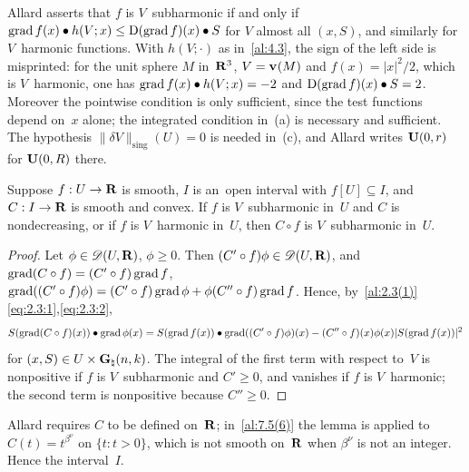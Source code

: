 \begin{remark}
    \label{rem:7.5(2)}
    Allard asserts that $f$ is $V$~subharmonic if and only if $\operatorname{grad} f(x) \bullet h(V;x) \le
    \mathrm{D}(\operatorname{grad} f)(x) \bullet S$ for $V$ almost all $(x,S)$, and similarly for $V$~harmonic functions.
    With $h(V;\cdot)$ as in~\ref{al:4.3}, the sign of the left side is misprinted: for the unit
    sphere $M$ in~$\mathbf{R}^3$, $V = \mathbf{v}_{}(M)$ and $f(x) = |x|^2/2$, which is $V$~harmonic, one has
    $\operatorname{grad} f(x) \bullet h(V;x) = -2$ and $\mathrm{D}(\operatorname{grad} f)(x) \bullet S = 2$. Moreover the pointwise
    condition is only sufficient, since the test functions depend on~$x$ alone; the integrated
    condition in~(a) is necessary and sufficient. The hypothesis $\|\delta V\|_{\mathrm{sing}}(U) =
    0$ is needed in~(c), and Allard writes $\mathbf{U}(0,r)$ for $\mathbf{U}(0,R)$ there.
\end{remark}

\begin{lemma}
    \label{al:7.5(3)}
    Suppose $f : U \to \mathbf{R}$ is smooth, $I$ is an~open interval with $f[U] \subseteq I$, and $C : I \to
    \mathbf{R}$ is smooth and convex. If $f$ is $V$~subharmonic in~$U$ and $C$ is nondecreasing, or if $f$
    is $V$~harmonic in~$U$, then $C \circ f$ is $V$~subharmonic in~$U$.
\end{lemma}

\begin{proof}
    Let $\phi \in \mathscr{D}(U,\mathbf{R})$, $\phi \ge 0$. Then $(C' \circ f) \phi \in \mathscr{D}(U,\mathbf{R})$, and
    $\operatorname{grad} (C \circ f) = (C' \circ f) \operatorname{grad} f$, $\operatorname{grad}((C' \circ f) \phi) = (C' \circ f) \operatorname{grad} \phi
    + \phi (C'' \circ f) \operatorname{grad} f$. Hence, by~\ref{al:2.3(1)}\eqref{eq:2.3:1},\eqref{eq:2.3:2},
    \begin{displaymath}
        S(\operatorname{grad} (C \circ f)(x)) \bullet \operatorname{grad} \phi(x) = S(\operatorname{grad} f(x)) \bullet \operatorname{grad}((C' \circ f)
        \phi)(x) - (C'' \circ f)(x) \phi(x) |S(\operatorname{grad} f(x))|^2
    \end{displaymath}
    for $(x,S) \in U \times \mathbf{G}_{\natural}(n,k)$. The integral of the first term with respect
    to~$V$ is nonpositive if $f$ is $V$~subharmonic and $C' \ge 0$, and vanishes if $f$ is
    $V$~harmonic; the second term is nonpositive because $C'' \ge 0$.
\end{proof}

\begin{remark}
    \label{rem:7.5(3)}
    Allard requires $C$ to be defined on~$\mathbf{R}$; in~\ref{al:7.5(6)} the lemma is applied to $C(t) =
    t^{\beta^\nu}$ on $\{ t : t > 0 \}$, which is not smooth on~$\mathbf{R}$ when $\beta^\nu$ is not an
    integer. Hence the interval~$I$.
\end{remark}


